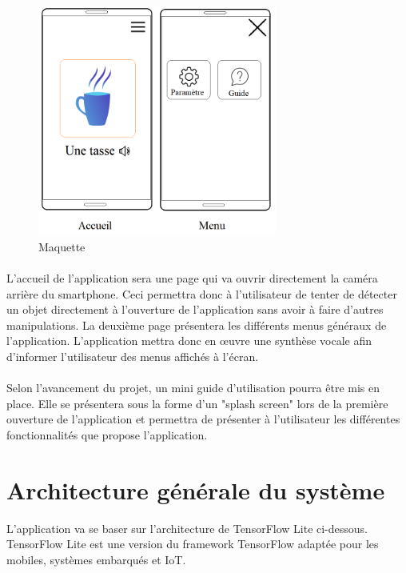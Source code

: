 \documentclass[CDS,UTF8,final]{EPURapport}
\begin{document}
\begin{figure}[h!]
  \centering
  \includegraphics[width=0.7\textwidth]{images/Maquette.png}
  \caption{Maquette}
  \label{fig:maquette}
\end{figure}

\paragraph{}
L'accueil de l'application sera une page qui va ouvrir directement la caméra arrière du smartphone. Ceci permettra donc à l'utilisateur de tenter de détecter un objet directement à l'ouverture de l'application sans avoir à faire d'autres manipulations. La deuxième page présentera les différents menus généraux de l'application. L'application mettra donc en œuvre une synthèse vocale afin d'informer l'utilisateur des menus affichés à l'écran.

\paragraph{}
Selon l'avancement du projet, un mini guide d'utilisation pourra être mis en place. Elle se présentera sous la forme d'un "splash screen" lors de la première ouverture de l'application et permettra de présenter à l'utilisateur les différentes fonctionnalités que propose l'application.

\section{Architecture générale du système}
L'application va se baser sur l'architecture de TensorFlow Lite ci-dessous. TensorFlow Lite est une version du framework TensorFlow adaptée pour les mobiles, systèmes embarqués et IoT.
\end{document}
